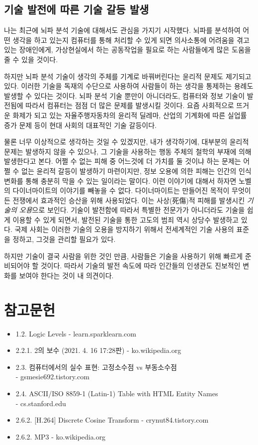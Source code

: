 \documentclass{article}
\begin{document}
\subsection{기술 발전에 따른 기술 갈등 발생}

나는 최근에 뇌파 분석 기술에 대해서도 관심을 가지기 시작했다.
뇌파를 분석하여 어떤 생각을 하고 있는지 컴퓨터를 통해 처리할 수 있게 되면
의사소통에 어려움을 겪고 있는 장애인에게, 가상현실에서 하는 공동작업을 필요로 하는 사람들에게
많은 도움을 줄 수 있을 것이다.

하지만 뇌파 분석 기술이 생각의 주체를 기계로 바꿔버린다는 윤리적 문제도 제기되고 있다.
이러한 기술을 독재의 수단으로 사용하여 사람들이 하는 생각을 통제하는 용례도 발생할 수 있다는 것이다.
뇌파 분석 기술 뿐만이 아니더라도, 컴퓨터와 정보 기술이 발전됨에 따라서 컴퓨터는 점점
더 많은 문제를 발생시킬 것이다.
요즘 사회적으로 뜨거운 화제가 되고 있는 자율주행자동차의 윤리적 딜레마,
산업의 기계화에 따른 실업률 증가 문제 등이 현대 사회의 대표적인 기술 갈등이다.

물론 너무 이상적으로 생각하는 것일 수 있겠지만, 내가 생각하기에, 대부분의 윤리적 문제는 발생하지
않을 수 있으나, 그 기술을 사용하는 행동 주체의 철학의 부재에 의해 발생한다고 본다.
어쩔 수 없는 피해 중 어느것에 더 가치를 둘 것이냐 하는 문제는 어쩔 수 없는 윤리적 갈등이 발생하기
마련이지만, 정보 오용에 의한 피해는 인간의 인식 변화를 통해 충분히 막을 수 있는 일이라는 말이다.
이런 이야기에 대해서 하자면 노벨의 다이너마이트의 이야기를 빼놓을 수 없다.
다이너마이트는 만들어진 목적이 무엇이든 전쟁에서 효과적인 승산을 위해 사용되었다.
이는 사상(死傷)적 피해를 발생시킨 \textit{기술의 오용}으로 보인다.
기술이 발전함에 따라서 특별한 전문가가 아니더라도 기술을 쉽게 이용할 수 있게 되면서,
발전된 기술을 통한 고도의 범죄 역시 상당수 발생하고 있다.
국제 사회는 이러한 기술의 오용을 방지하기 위해서 전세계적인 기술 사용의 표준을 정하고,
그것을 관리할 필요가 있다.

하지만 기술이 결국 사람을 위한 것인 만큼, 사람들은 기술을 사용하기 위해 빠르게 준비되어야 할 것이다.
따라서 기술의 발전 속도에 따라 인간들의 인생관도 진보적인 변화를 보여야 한다는 것이 내 의견이다.

\section{참고문헌}

\begin{itemize}
    \item 1.2. Logic Levels - learn.sparklearn.com
    \item 2.2.1. 2의 보수 (2021. 4. 16 17:28판) - ko.wikipedia.org
    \item 2.3. 컴퓨터에서의 실수 표현: 고정소수점 vs 부동소수점 \\- gsmesie692.tistory.com
    \item 2.4. ASCII/ISO 8859-1 (Latin-1) Table with HTML Entity Names \\- cs.stanford.edu
    \item 2.6.2. [H.264] Discrete Cosine Transform - crynut84.tistory.com
    \item 2.6.2. MP3 - ko.wikipedia.org
\end{itemize}
\end{document}
